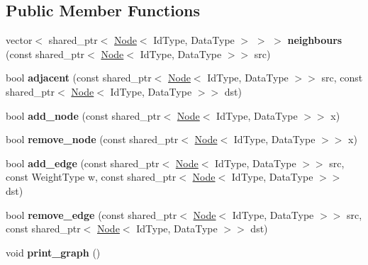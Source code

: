 \subsection*{Public Member Functions}
\begin{DoxyCompactItemize}
\item 
\mbox{\label{class_graph_a_m_ad836760d4913946d23c094d71633a8cc}} 
vector$<$ shared\+\_\+ptr$<$ \hyperlink{class_node}{Node}$<$ Id\+Type, Data\+Type $>$ $>$ $>$ {\bfseries neighbours} (const shared\+\_\+ptr$<$ \hyperlink{class_node}{Node}$<$ Id\+Type, Data\+Type $>$$>$ src)
\item 
\mbox{\label{class_graph_a_m_a0b73daf188e1160312d8f464148d4150}} 
bool {\bfseries adjacent} (const shared\+\_\+ptr$<$ \hyperlink{class_node}{Node}$<$ Id\+Type, Data\+Type $>$$>$ src, const shared\+\_\+ptr$<$ \hyperlink{class_node}{Node}$<$ Id\+Type, Data\+Type $>$$>$ dst)
\item 
\mbox{\label{class_graph_a_m_afaa990c8a8e89d26189a6b3434df9637}} 
bool {\bfseries add\+\_\+node} (const shared\+\_\+ptr$<$ \hyperlink{class_node}{Node}$<$ Id\+Type, Data\+Type $>$$>$ x)
\item 
\mbox{\label{class_graph_a_m_aa12d21d0772cfa22549791210d897cad}} 
bool {\bfseries remove\+\_\+node} (const shared\+\_\+ptr$<$ \hyperlink{class_node}{Node}$<$ Id\+Type, Data\+Type $>$$>$ x)
\item 
\mbox{\label{class_graph_a_m_a1f578a3b7253897950b93b30727e841b}} 
bool {\bfseries add\+\_\+edge} (const shared\+\_\+ptr$<$ \hyperlink{class_node}{Node}$<$ Id\+Type, Data\+Type $>$$>$ src, const Weight\+Type w, const shared\+\_\+ptr$<$ \hyperlink{class_node}{Node}$<$ Id\+Type, Data\+Type $>$$>$ dst)
\item 
\mbox{\label{class_graph_a_m_a6fec308f47cd83098f2fc526b2c8e9d0}} 
bool {\bfseries remove\+\_\+edge} (const shared\+\_\+ptr$<$ \hyperlink{class_node}{Node}$<$ Id\+Type, Data\+Type $>$$>$ src, const shared\+\_\+ptr$<$ \hyperlink{class_node}{Node}$<$ Id\+Type, Data\+Type $>$$>$ dst)
\item 
\mbox{\label{class_graph_a_m_a17cd6866c903b8729024e18244b62000}} 
void {\bfseries print\+\_\+graph} ()
\end{DoxyCompactItemize}
